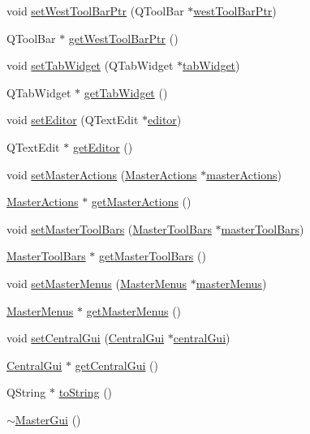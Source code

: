 \begin{DoxyCompactItemize}
\item 
void \hyperlink{class_master_gui_a768fa0a0b9cb7886f703b7b60f0b1f57}{set\-West\-Tool\-Bar\-Ptr} (Q\-Tool\-Bar $\ast$\hyperlink{class_master_gui_ad8bf561c56063077e97f9a993fa38ee4}{west\-Tool\-Bar\-Ptr})
\item 
Q\-Tool\-Bar $\ast$ \hyperlink{class_master_gui_a6863200bf96fb94a3afee4696762f259}{get\-West\-Tool\-Bar\-Ptr} ()
\item 
void \hyperlink{class_master_gui_a528332ae24456ea6efddaba74527852b}{set\-Tab\-Widget} (Q\-Tab\-Widget $\ast$\hyperlink{class_master_gui_a3bca8bd4cc4ecef70de27afff52a7b08}{tab\-Widget})
\item 
Q\-Tab\-Widget $\ast$ \hyperlink{class_master_gui_a6dd82c5ecf1ed32a4b67de6d4778b5d8}{get\-Tab\-Widget} ()
\item 
void \hyperlink{class_master_gui_ab468fb7b10a30bf6350bf030ce32a5fa}{set\-Editor} (Q\-Text\-Edit $\ast$\hyperlink{class_master_gui_a0681f0b3d1828d84c0c0cd7e4d765d98}{editor})
\item 
Q\-Text\-Edit $\ast$ \hyperlink{class_master_gui_a1f6fc301c337d7ec0e77425a3b6573c1}{get\-Editor} ()
\item 
void \hyperlink{class_master_gui_aa7ab2e7e8f2a5128eb8b6b14fc569ec4}{set\-Master\-Actions} (\hyperlink{class_master_actions}{Master\-Actions} $\ast$\hyperlink{class_master_gui_a85dc72333d336db18a92207a09db4ce3}{master\-Actions})
\item 
\hyperlink{class_master_actions}{Master\-Actions} $\ast$ \hyperlink{class_master_gui_a529d566a29d89fd686a5f8d37cad8aef}{get\-Master\-Actions} ()
\item 
void \hyperlink{class_master_gui_a355c5dcc87dc16c5bbe5b5917cc54392}{set\-Master\-Tool\-Bars} (\hyperlink{class_master_tool_bars}{Master\-Tool\-Bars} $\ast$\hyperlink{class_master_gui_afb90e8f19dae43cb78c8495e5708e68b}{master\-Tool\-Bars})
\item 
\hyperlink{class_master_tool_bars}{Master\-Tool\-Bars} $\ast$ \hyperlink{class_master_gui_a14e04dcaf7233f6ce5fce47b58e18ef5}{get\-Master\-Tool\-Bars} ()
\item 
void \hyperlink{class_master_gui_a377da4ce23db123d0e2cef68d2409e1d}{set\-Master\-Menus} (\hyperlink{class_master_menus}{Master\-Menus} $\ast$\hyperlink{class_master_gui_a27f793278e486a5bfec69ef366199e5d}{master\-Menus})
\item 
\hyperlink{class_master_menus}{Master\-Menus} $\ast$ \hyperlink{class_master_gui_ab2d15cb4a25f2fb75a10e01e0f93a850}{get\-Master\-Menus} ()
\item 
void \hyperlink{class_master_gui_a76571dfcf6fac7274f39e90d72929564}{set\-Central\-Gui} (\hyperlink{class_central_gui}{Central\-Gui} $\ast$\hyperlink{class_master_gui_a565fc5a3622b8b5417b26dd1306439b8}{central\-Gui})
\item 
\hyperlink{class_central_gui}{Central\-Gui} $\ast$ \hyperlink{class_master_gui_a8672503d8c79f2377f76a04791e56530}{get\-Central\-Gui} ()
\item 
Q\-String $\ast$ \hyperlink{class_master_gui_a96d5da37e4de63a0c0e9d36eb4a53f1e}{to\-String} ()
\item 
\hyperlink{class_master_gui_a4eeae08177c54aba4aad160fc1c5efc6}{$\sim$\-Master\-Gui} ()
\end{DoxyCompactItemize}
